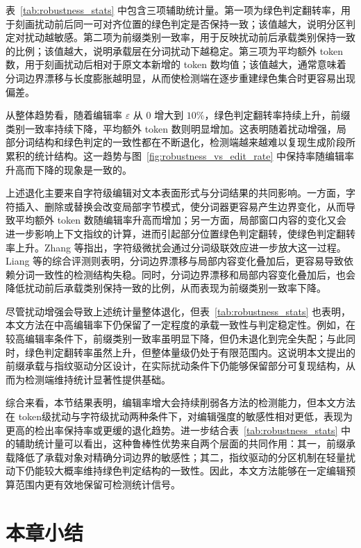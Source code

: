 表~\ref{tab:robustness_stats} 中包含三项辅助统计量。第一项为绿色判定翻转率，用于刻画扰动前后同一可对齐位置的绿色判定是否保持一致；该值越大，说明分区判定对扰动越敏感。第二项为前缀类别一致率，用于反映扰动前后承载类别保持一致的比例；该值越大，说明承载层在分词扰动下越稳定。第三项为平均额外 token 数，用于刻画扰动后相对于原文本新增的 token 数均值；该值越大，通常意味着分词边界漂移与长度膨胀越明显，从而使检测端在逐步重建绿色集合时更容易出现偏差。

从整体趋势看，随着编辑率 $\varepsilon$ 从 $0$ 增大到 $10\%$，绿色判定翻转率持续上升，前缀类别一致率持续下降，平均额外 token 数则明显增加。这表明随着扰动增强，局部分词结构和绿色判定的一致性都在不断退化，检测端越来越难以复现生成阶段所累积的统计结构。这一趋势与图~\ref{fig:robustness_vs_edit_rate} 中保持率随编辑率升高而下降的现象是一致的。

上述退化主要来自字符级编辑对文本表面形式与分词结果的共同影响。一方面，字符插入、删除或替换会改变局部字节模式，使分词器更容易产生边界变化，从而导致平均额外 token 数随编辑率升高而增加；另一方面，局部窗口内容的变化又会进一步影响上下文指纹的计算，进而引起部分位置绿色判定翻转，使绿色判定翻转率上升。Zhang 等指出，字符级微扰会通过分词级联效应进一步放大这一过程\cite{zhang2025character}。Liang 等的综合评测则表明，分词边界漂移与局部内容变化叠加后，更容易导致依赖分词一致性的检测结构失稳\cite{liang2024waterpark}。同时，分词边界漂移和局部内容变化叠加后，也会降低扰动前后承载类别保持一致的比例，从而表现为前缀类别一致率下降。

尽管扰动增强会导致上述统计量整体退化，但表~\ref{tab:robustness_stats} 也表明，本文方法在中高编辑率下仍保留了一定程度的承载一致性与判定稳定性。例如，在较高编辑率条件下，前缀类别一致率虽明显下降，但仍未退化到完全失配；与此同时，绿色判定翻转率虽然上升，但整体量级仍处于有限范围内。这说明本文提出的前缀承载与指纹驱动分区设计，在实际扰动条件下仍能够保留部分可复现结构，从而为检测端维持统计显著性提供基础。

综合来看，本节结果表明，编辑率增大会持续削弱各方法的检测能力，但本文方法在 token级扰动与字符级扰动两种条件下，对编辑强度的敏感性相对更低，表现为更高的检出率保持率或更缓的退化趋势。进一步结合表~\ref{tab:robustness_stats} 中的辅助统计量可以看出，这种鲁棒性优势来自两个层面的共同作用：其一，前缀承载降低了承载对象对精确分词边界的敏感性；其二，指纹驱动的分区机制在轻量扰动下仍能较大概率维持绿色判定结构的一致性。因此，本文方法能够在一定编辑预算范围内更有效地保留可检测统计信号。

\section{本章小结}

